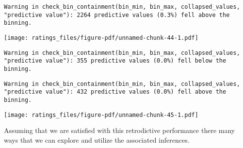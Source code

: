 \documentclass[
  letterpaper,
  DIV=11,
  numbers=noendperiod]{scrartcl}
\newenvironment{Shaded}{\begin{snugshade}}{\end{snugshade}}
\newcommand{\AttributeTok}[1]{\textcolor[rgb]{0.40,0.45,0.13}{#1}}
\newcommand{\DecValTok}[1]{\textcolor[rgb]{0.68,0.00,0.00}{#1}}
\newcommand{\FloatTok}[1]{\textcolor[rgb]{0.68,0.00,0.00}{#1}}
\newcommand{\FunctionTok}[1]{\textcolor[rgb]{0.28,0.35,0.67}{#1}}
\newcommand{\NormalTok}[1]{\textcolor[rgb]{0.00,0.23,0.31}{#1}}
\newcommand{\OtherTok}[1]{\textcolor[rgb]{0.00,0.23,0.31}{#1}}
\newcommand{\SpecialCharTok}[1]{\textcolor[rgb]{0.37,0.37,0.37}{#1}}
\newcommand{\StringTok}[1]{\textcolor[rgb]{0.13,0.47,0.30}{#1}}
\begin{document}
\begin{verbatim}
Warning in check_bin_containment(bin_min, bin_max, collapsed_values,
"predictive value"): 2264 predictive values (0.3%) fell above the binning.
\end{verbatim}

\texttt{[image: ratings\_files/figure-pdf/unnamed-chunk-44-1.pdf]}

\begin{Shaded}
\end{Shaded}

\begin{verbatim}
Warning in check_bin_containment(bin_min, bin_max, collapsed_values,
"predictive value"): 355 predictive values (0.0%) fell below the binning.
\end{verbatim}

\begin{verbatim}
Warning in check_bin_containment(bin_min, bin_max, collapsed_values,
"predictive value"): 432 predictive values (0.0%) fell above the binning.
\end{verbatim}

\texttt{[image: ratings\_files/figure-pdf/unnamed-chunk-45-1.pdf]}

Assuming that we are satisfied with this retrodictive performance there
many ways that we can explore and utilize the associated inferences.
\end{document}
